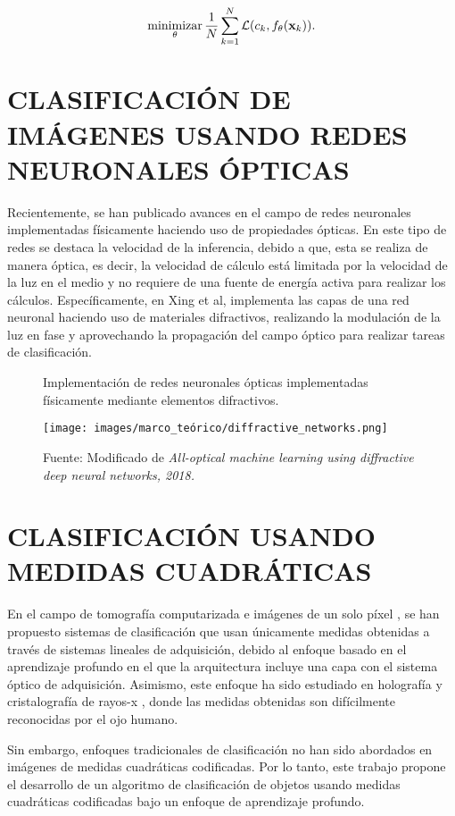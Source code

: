 \begin{equation}
    \operatorname*{minimizar}_\theta \frac{1}{N}\sum_{k=1}^{N} \mathcal{L}( {c}_k,  f_\theta(\mathbf{x}_k)).
    \label{eq:optimización_nn}
\end{equation}
\section{CLASIFICACIÓN DE IMÁGENES USANDO REDES NEURONALES ÓPTICAS}


Recientemente, se han publicado avances en el campo de redes neuronales implementadas físicamente haciendo uso de propiedades ópticas. En este tipo de redes se destaca la velocidad de la inferencia, debido a que, esta se realiza de manera óptica, es decir, la velocidad de cálculo está limitada por la velocidad de la luz en el medio y no requiere de una fuente de energía activa para realizar los cálculos. Específicamente, en  Xing et al, implementa las capas de una red neuronal haciendo uso de materiales difractivos, realizando la modulación de la luz en fase y aprovechando la propagación del campo óptico para realizar tareas de clasificación.


\begin{figure}[!h]
    \centering
    \caption{Implementación de redes neuronales ópticas implementadas físicamente mediante elementos difractivos.}
    \texttt{[image: images/marco\_teórico/diffractive\_networks.png]}
    \caption*{Fuente: Modificado de \textit{All-optical machine learning using diffractive deep neural networks, 2018.}}
    \label{fig:optical_networks}
\end{figure}

\section{CLASIFICACIÓN USANDO MEDIDAS CUADRÁTICAS}
En el campo de tomografía computarizada  e imágenes de un solo píxel , se han propuesto sistemas de clasificación que usan únicamente medidas obtenidas a través de sistemas lineales de adquisición, debido al enfoque basado en el aprendizaje profundo en el que la arquitectura incluye una capa con el sistema óptico de adquisición. Asimismo, este enfoque ha sido estudiado en holografía  y cristalografía de rayos-x , donde las medidas obtenidas son difícilmente reconocidas por el ojo humano. 

Sin embargo, enfoques tradicionales de clasificación no han sido abordados en imágenes de medidas cuadráticas codificadas. Por lo tanto, este trabajo propone el desarrollo de un algoritmo de clasificación de objetos usando medidas cuadráticas codificadas bajo un enfoque de aprendizaje profundo. 




